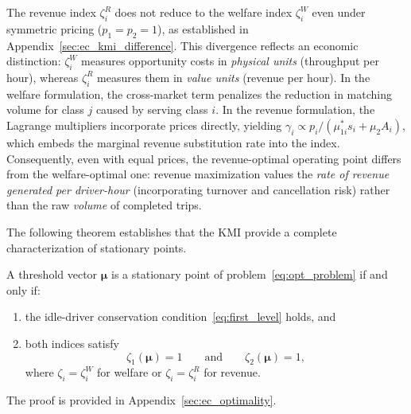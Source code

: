 \begin{remark}
\label{remark:kmi_difference}
The revenue index $\zeta_i^R$ does not reduce to the welfare index $\zeta_i^W$ even under symmetric pricing ($p_1 = p_2 = 1$), as established in Appendix~\ref{sec:ec_kmi_difference}.
This divergence reflects an economic distinction: $\zeta_i^W$ measures opportunity costs in \emph{physical units} (throughput per hour), whereas $\zeta_i^R$ measures them in \emph{value units} (revenue per hour).
In the welfare formulation, the cross-market term penalizes the reduction in matching volume for class $j$ caused by serving class $i$.
In the revenue formulation, the Lagrange multipliers incorporate prices directly, yielding $\gamma_i \propto p_i / (\mu_{1i}^* s_i + \mu_2 A_i)$, which embeds the marginal revenue substitution rate into the index.
Consequently, even with equal prices, the revenue-optimal operating point differs from the welfare-optimal one: revenue maximization values the \emph{rate of revenue generated per driver-hour} (incorporating turnover and cancellation risk) rather than the raw \emph{volume} of completed trips.
\end{remark}

The following theorem establishes that the KMI provide a complete characterization of stationary points.

\begin{theorem}
\label{thm:general_optimality}
A threshold vector $\boldsymbol{\mu}$ is a stationary point of problem~\eqref{eq:opt_problem} if and only if:
\begin{enumerate}
    \item the idle-driver conservation condition~\eqref{eq:first_level} holds, and
    \item both indices satisfy 
    \begin{equation*}
      \zeta_1(\boldsymbol{\mu}) = 1
      \qquad\text{and}\qquad
      \zeta_2(\boldsymbol{\mu}) = 1,
    \end{equation*}
    where $\zeta_i = \zeta_i^W$ for welfare or $\zeta_i = \zeta_i^R$ for revenue.
\end{enumerate}
The proof is provided in Appendix~\ref{sec:ec_optimality}.
\end{theorem}

